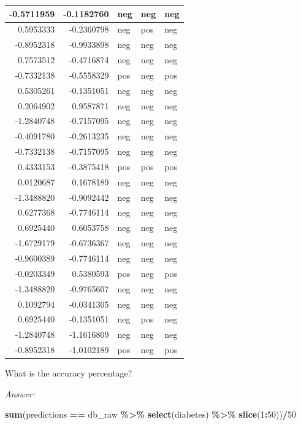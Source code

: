 \documentclass[
]{book}
\newenvironment{Shaded}{\begin{snugshade}}{\end{snugshade}}
\newcommand{\DecValTok}[1]{\textcolor[rgb]{0.00,0.00,0.81}{#1}}
\newcommand{\FunctionTok}[1]{\textcolor[rgb]{0.13,0.29,0.53}{\textbf{#1}}}
\newcommand{\NormalTok}[1]{#1}
\newcommand{\SpecialCharTok}[1]{\textcolor[rgb]{0.81,0.36,0.00}{\textbf{#1}}}
\begin{document}
\begin{tabular}{r|r|l|l|l}
\hline
-0.5711959 & -0.1182760 & neg & neg & neg\\
\hline
0.5953333 & -0.2360798 & neg & pos & neg\\
\hline
-0.8952318 & -0.9933898 & neg & neg & neg\\
\hline
0.7573512 & -0.4716874 & neg & neg & neg\\
\hline
-0.7332138 & -0.5558329 & pos & neg & pos\\
\hline
0.5305261 & -0.1351051 & neg & neg & neg\\
\hline
0.2064902 & 0.9587871 & neg & neg & neg\\
\hline
-1.2840748 & -0.7157095 & neg & neg & neg\\
\hline
-0.4091780 & -0.2613235 & neg & neg & neg\\
\hline
-0.7332138 & -0.7157095 & neg & neg & neg\\
\hline
0.4333153 & -0.3875418 & pos & pos & pos\\
\hline
0.0120687 & 0.1678189 & neg & neg & neg\\
\hline
-1.3488820 & -0.9092442 & neg & neg & neg\\
\hline
0.6277368 & -0.7746114 & neg & neg & neg\\
\hline
0.6925440 & 0.6053758 & neg & neg & neg\\
\hline
-1.6729179 & -0.6736367 & neg & neg & neg\\
\hline
-0.9600389 & -0.7746114 & neg & neg & neg\\
\hline
-0.0203349 & 0.5380593 & pos & neg & pos\\
\hline
-1.3488820 & -0.9765607 & neg & neg & neg\\
\hline
0.1092794 & -0.0341305 & neg & neg & neg\\
\hline
0.6925440 & -0.1351051 & neg & pos & neg\\
\hline
-1.2840748 & -1.1616809 & neg & neg & neg\\
\hline
-0.8952318 & -1.0102189 & pos & neg & pos\\
\hline
\end{tabular}

What is the accuracy percentage?

\emph{Answer:}

\begin{Shaded}
\begin{Highlighting}[]
\FunctionTok{sum}\NormalTok{(predictions }\SpecialCharTok{==}\NormalTok{ db\_raw }\SpecialCharTok{\%\textgreater{}\%} \FunctionTok{select}\NormalTok{(diabetes) }\SpecialCharTok{\%\textgreater{}\%} \FunctionTok{slice}\NormalTok{(}\DecValTok{1}\SpecialCharTok{:}\DecValTok{50}\NormalTok{))}\SpecialCharTok{/}\DecValTok{50}
\end{Highlighting}
\end{Shaded}
\end{document}
